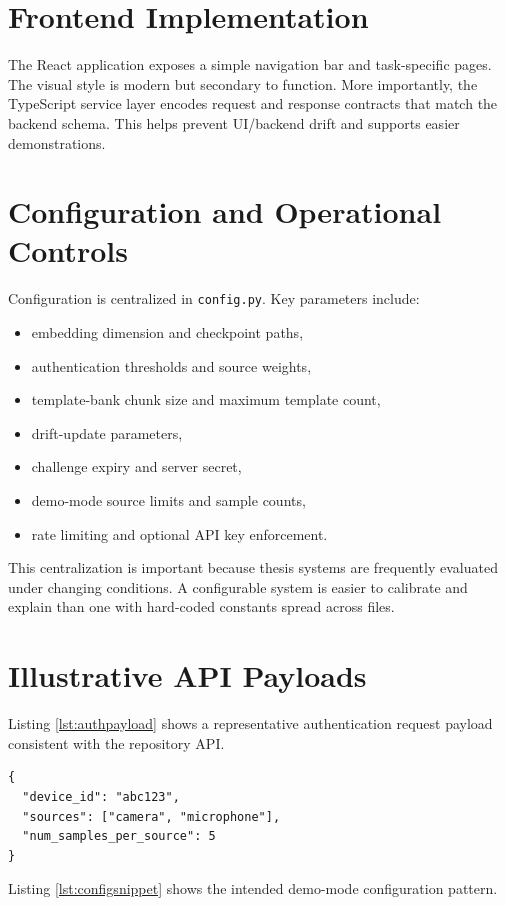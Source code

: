 \documentclass[12pt]{report}
\begin{document}
\section{Frontend Implementation}
The React application exposes a simple navigation bar and task-specific pages. The visual style is modern but secondary to function. More importantly, the TypeScript service layer encodes request and response contracts that match the backend schema. This helps prevent UI/backend drift and supports easier demonstrations.

\section{Configuration and Operational Controls}
Configuration is centralized in \texttt{config.py}. Key parameters include:
\begin{itemize}[leftmargin=1.2cm]
\item embedding dimension and checkpoint paths,
\item authentication thresholds and source weights,
\item template-bank chunk size and maximum template count,
\item drift-update parameters,
\item challenge expiry and server secret,
\item demo-mode source limits and sample counts,
\item rate limiting and optional API key enforcement.
\end{itemize}

This centralization is important because thesis systems are frequently evaluated under changing conditions. A configurable system is easier to calibrate and explain than one with hard-coded constants spread across files.

\section{Illustrative API Payloads}
Listing \ref{lst:authpayload} shows a representative authentication request payload consistent with the repository API.

\begin{lstlisting}[language={},caption={Representative authentication request payload},label={lst:authpayload}]
{
  "device_id": "abc123",
  "sources": ["camera", "microphone"],
  "num_samples_per_source": 5
}
\end{lstlisting}

Listing \ref{lst:configsnippet} shows the intended demo-mode configuration pattern.
\end{document}
